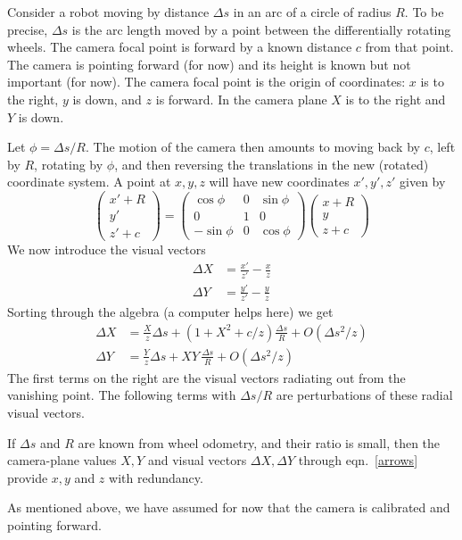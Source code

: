\documentclass[12pt]{article}
\begin{document}
\noindent Consider a robot moving by distance $\Delta s$ in an arc of a
circle of radius $R$.  To be precise, $\Delta s$ is the arc length
moved by a point between the differentially rotating wheels.
The camera focal point is forward by a known distance $c$ from that
point.  The camera is pointing forward (for now) and its height is
known but not important (for now).  The camera focal point is the
origin of coordinates: $x$ is to the right, $y$ is down, and $z$ is
forward.  In the camera plane $X$ is to the right and $Y$ is down.

Let $\phi=\Delta s/R$.  The motion of the camera then amounts to
moving back by $c$, left by $R$, rotating by $\phi$, and then
reversing the translations in the new (rotated) coordinate system.  A
point at $x,y,z$ will have new coordinates $x',y',z'$ given by
\begin{equation}
  \begin{pmatrix} x' + R \\ y' \\ z' + c \end{pmatrix} =
  \begin{pmatrix}
    \cos\phi & 0 & \sin\phi \\
    0        & 1 & 0 \\
   -\sin\phi & 0 & \cos\phi
  \end{pmatrix}
  \begin{pmatrix} x  + R \\ y \\ z  + c \end{pmatrix}
\end{equation}
We now introduce the visual vectors
\begin{equation}
\begin{aligned}
  \Delta X &= \frac{x'}{z'}-\frac xz \\
  \Delta Y &= \frac{y'}{z'}-\frac yz
\end{aligned}
\end{equation}
Sorting through the algebra (a computer helps here) we get
\begin{equation}\label{arrows}
\begin{aligned}
  \Delta X &= \frac Xz \Delta s + (1+X^2 + c/z) \frac{\Delta s}R
  + O\left(\Delta s^2/z\right) \\
  \Delta Y &= \frac Yz \Delta s + XY \,\frac{\Delta s}R
  + O\left(\Delta s^2/z\right)
\end{aligned}
\end{equation}
The first terms on the right are the visual vectors radiating out from
the vanishing point.  The following terms with $\Delta s/R$ are
perturbations of these radial visual vectors.

If $\Delta s$ and $R$ are known from wheel odometry, and their ratio
is small, then the camera-plane values $X,Y$ and visual vectors
$\Delta X,\Delta Y$ through eqn.~\eqref{arrows} provide $x,y$ and $z$
with redundancy.

As mentioned above, we have assumed for now that the camera is
calibrated and pointing forward.
\end{document}
